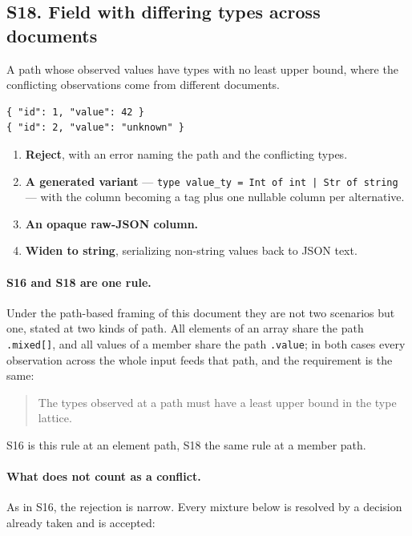\subsection*{S18. Field with differing types across documents}

A path whose observed values have types with no least upper bound, where the
conflicting observations come from different documents.

\begin{lstlisting}[style=json]
{ "id": 1, "value": 42 }
{ "id": 2, "value": "unknown" }
\end{lstlisting}

\options
\begin{enumerate}[label=\textbf{(\alph*)}]
  \item \textbf{Reject}, with an error naming the path and the conflicting
        types. \selected
  \item \textbf{A generated variant} --- \texttt{type value\_ty = Int of int |
        Str of string} --- with the column becoming a tag plus one nullable
        column per alternative.
  \item \textbf{An opaque raw-JSON column.}
  \item \textbf{Widen to string}, serializing non-string values back to JSON
        text.
\end{enumerate}


\paragraph{S16 and S18 are one rule.}
Under the path-based framing of this document they are not two scenarios but
one, stated at two kinds of path. All elements of an array share the path
\texttt{.mixed[]}, and all values of a member share the path
\texttt{.value}; in both cases every observation across the whole input feeds
that path, and the requirement is the same:

\begin{quote}
The types observed at a path must have a least upper bound in the type
lattice.
\end{quote}

\noindent
S16 is this rule at an element path, S18 the same rule at a member path.

\paragraph{What does not count as a conflict.}
As in S16, the rejection is narrow. Every mixture below is resolved by a
decision already taken and is accepted:

